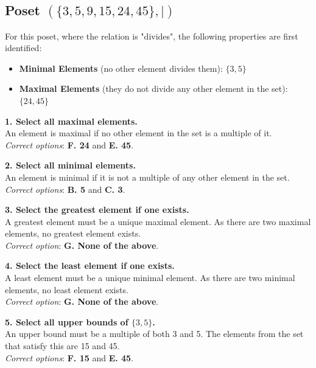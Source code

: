 \documentclass[10pt]{article}
\theoremstyle{definition}
\theoremstyle{plain}
\numberwithin{equation}{section}
\begin{document}
\subsection*{Poset $(\{3,5,9,15,24,45\}, \mid)$}
For this poset, where the relation is "divides", the following properties are first identified:
\begin{itemize}
  \item \textbf{Minimal Elements} (no other element divides them): $\{3, 5\}$
  \item \textbf{Maximal Elements} (they do not divide any other element in the set): $\{24, 45\}$
\end{itemize}

\noindent\textbf{1. Select all maximal elements.} \\
An element is maximal if no other element in the set is a multiple of it. \\
\textit{Correct options}: \textbf{F. 24} and \textbf{E. 45}.

\vspace{1em}
\noindent\textbf{2. Select all minimal elements.} \\
An element is minimal if it is not a multiple of any other element in the set. \\
\textit{Correct options}: \textbf{B. 5} and \textbf{C. 3}.

\vspace{1em}
\noindent\textbf{3. Select the greatest element if one exists.} \\
A greatest element must be a unique maximal element. As there are two maximal elements, no greatest element exists. \\
\textit{Correct option}: \textbf{G. None of the above}.

\vspace{1em}
\noindent\textbf{4. Select the least element if one exists.} \\
A least element must be a unique minimal element. As there are two minimal elements, no least element exists. \\
\textit{Correct option}: \textbf{G. None of the above}.

\vspace{1em}
\noindent\textbf{5. Select all upper bounds of $\{3,5\}$.} \\
An upper bound must be a multiple of both 3 and 5. The elements from the set that satisfy this are 15 and 45. \\
\textit{Correct options}: \textbf{F. 15} and \textbf{E. 45}.
\end{document}
